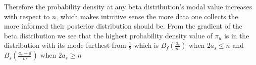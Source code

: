 \documentclass[12pt,letterpaper]{article}
\begin{document}
Therefore the probability density at any beta distribution's modal value increases with respect to $n$, 
which makes intuitive sense the more data one collects the more informed their posterior distribution should be.
From the gradient of the beta distribution we see that the highest probability density value of $\pi_u$ is in the distribution with its mode furthest from $\frac{1}{2}$ which is 
$B_f(\frac{a_s}{m})$ when $2a_s\le n$ and $B_s(\frac{a_s+d}{m})$ when $2a_s\ge n$
\end{document}

